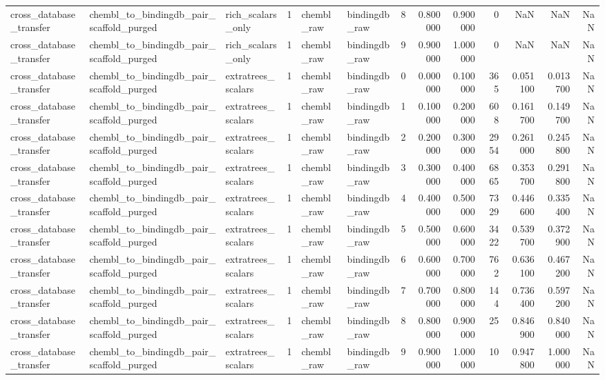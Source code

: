 \begin{longtable}{lllrllrrrrrrr}
cross\_database\_transfer & chembl\_to\_bindingdb\_pair\_scaffold\_purged & rich\_scalars\_only & 1 & chembl\_raw & bindingdb\_raw & 8 & 0.800000 & 0.900000 & 0 & NaN & NaN & NaN \\
cross\_database\_transfer & chembl\_to\_bindingdb\_pair\_scaffold\_purged & rich\_scalars\_only & 1 & chembl\_raw & bindingdb\_raw & 9 & 0.900000 & 1.000000 & 0 & NaN & NaN & NaN \\
cross\_database\_transfer & chembl\_to\_bindingdb\_pair\_scaffold\_purged & extratrees\_scalars & 1 & chembl\_raw & bindingdb\_raw & 0 & 0.000000 & 0.100000 & 365 & 0.051100 & 0.013700 & NaN \\
cross\_database\_transfer & chembl\_to\_bindingdb\_pair\_scaffold\_purged & extratrees\_scalars & 1 & chembl\_raw & bindingdb\_raw & 1 & 0.100000 & 0.200000 & 608 & 0.161700 & 0.149700 & NaN \\
cross\_database\_transfer & chembl\_to\_bindingdb\_pair\_scaffold\_purged & extratrees\_scalars & 1 & chembl\_raw & bindingdb\_raw & 2 & 0.200000 & 0.300000 & 2954 & 0.261000 & 0.245800 & NaN \\
cross\_database\_transfer & chembl\_to\_bindingdb\_pair\_scaffold\_purged & extratrees\_scalars & 1 & chembl\_raw & bindingdb\_raw & 3 & 0.300000 & 0.400000 & 6865 & 0.353700 & 0.291800 & NaN \\
cross\_database\_transfer & chembl\_to\_bindingdb\_pair\_scaffold\_purged & extratrees\_scalars & 1 & chembl\_raw & bindingdb\_raw & 4 & 0.400000 & 0.500000 & 7329 & 0.446600 & 0.335400 & NaN \\
cross\_database\_transfer & chembl\_to\_bindingdb\_pair\_scaffold\_purged & extratrees\_scalars & 1 & chembl\_raw & bindingdb\_raw & 5 & 0.500000 & 0.600000 & 3422 & 0.539700 & 0.372900 & NaN \\
cross\_database\_transfer & chembl\_to\_bindingdb\_pair\_scaffold\_purged & extratrees\_scalars & 1 & chembl\_raw & bindingdb\_raw & 6 & 0.600000 & 0.700000 & 762 & 0.636100 & 0.467200 & NaN \\
cross\_database\_transfer & chembl\_to\_bindingdb\_pair\_scaffold\_purged & extratrees\_scalars & 1 & chembl\_raw & bindingdb\_raw & 7 & 0.700000 & 0.800000 & 144 & 0.736400 & 0.597200 & NaN \\
cross\_database\_transfer & chembl\_to\_bindingdb\_pair\_scaffold\_purged & extratrees\_scalars & 1 & chembl\_raw & bindingdb\_raw & 8 & 0.800000 & 0.900000 & 25 & 0.846900 & 0.840000 & NaN \\
cross\_database\_transfer & chembl\_to\_bindingdb\_pair\_scaffold\_purged & extratrees\_scalars & 1 & chembl\_raw & bindingdb\_raw & 9 & 0.900000 & 1.000000 & 10 & 0.947800 & 1.000000 & NaN \\

\end{longtable}

